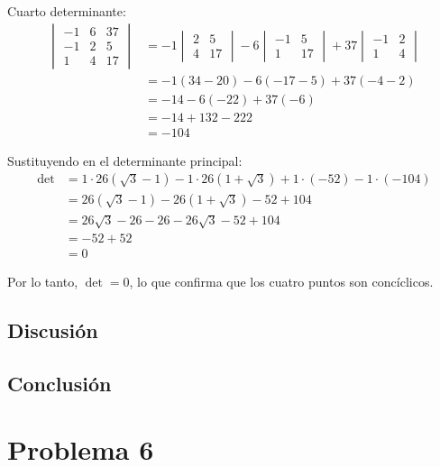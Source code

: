 \documentclass{article}
\begin{document}
Cuarto determinante:
\begin{align}
\begin{vmatrix}
-1 & 6 & 37 \\
-1 & 2 & 5 \\
1 & 4 & 17
\end{vmatrix} &= -1 \begin{vmatrix} 2 & 5 \\ 4 & 17 \end{vmatrix} - 6 \begin{vmatrix} -1 & 5 \\ 1 & 17 \end{vmatrix} + 37 \begin{vmatrix} -1 & 2 \\ 1 & 4 \end{vmatrix} \\
&= -1(34-20) - 6(-17-5) + 37(-4-2) \\
&= -14 - 6(-22) + 37(-6) \\
&= -14 + 132 - 222 \\
&= -104
\end{align}

Sustituyendo en el determinante principal:
\begin{align}
\det &= 1 \cdot 26(\sqrt{3} - 1) - 1 \cdot 26(1 + \sqrt{3}) + 1 \cdot (-52) - 1 \cdot (-104) \\
&= 26(\sqrt{3} - 1) - 26(1 + \sqrt{3}) - 52 + 104 \\
&= 26\sqrt{3} - 26 - 26 - 26\sqrt{3} - 52 + 104 \\
&= -52 + 52 \\
&= 0
\end{align}

Por lo tanto, $\det = 0$, lo que confirma que los cuatro puntos son concíclicos.

\subsection{Discusión}

\subsection{Conclusión}

\section{Problema 6}
\end{document}
